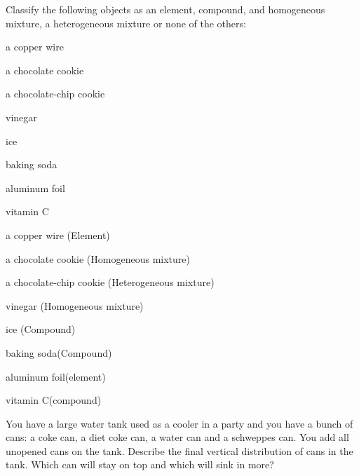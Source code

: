 \documentclass[main.tex]{subfiles}
\begin{document}
\begin{multicols*}{2}
\begin{question}[ID=\the\value{numA}]
Classify the following objects as an element, compound, and homogeneous mixture, a heterogeneous mixture or none of the others:
\begin{inparaenum}[(a)]
\item a copper wire
\item a chocolate cookie
\item a chocolate-chip cookie
\item vinegar
\item ice
\item baking soda
\item aluminum foil
\item vitamin C
 \end{inparaenum}

\end{question}
\begin{solution}
\begin{inparaenum}[(a)]
\item a copper wire (Element)
\item a chocolate cookie (Homogeneous mixture)
\item a chocolate-chip cookie (Heterogeneous mixture)
\item vinegar (Homogeneous mixture)
\item ice (Compound)
\item baking soda(Compound)
\item aluminum foil(element)
\item vitamin C(compound)
 \end{inparaenum}
\hspace{0.1cm}\end{solution}%





\begin{question}[ID=\the\value{numA}]
You have a large water tank used as a cooler in a party and you have a bunch of cans: a coke can, a diet coke can, a water can and a schweppes can. You add all unopened cans on the tank. Describe the final vertical distribution of cans in the tank. Which can will stay on top and which will sink in more?
\end{question}
\begin{solution}

\hspace{0.1cm}\end{solution}%










\end{multicols*}
\end{document}
